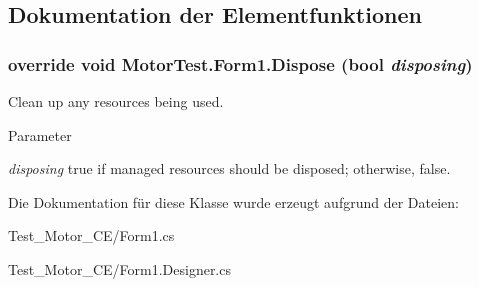 \subsection{Dokumentation der Elementfunktionen}
\hypertarget{class_motor_test_1_1_form1_ac013ea3d053663a5aa419e04c31e5273}{
\subsubsection[{Dispose}]{\setlength{\rightskip}{0pt plus 5cm}override void MotorTest.Form1.Dispose (bool {\em disposing})}}
\label{class_motor_test_1_1_form1_ac013ea3d053663a5aa419e04c31e5273}


Clean up any resources being used. 


\begin{DoxyParams}{Parameter}
\item[{\em disposing}]true if managed resources should be disposed; otherwise, false.\end{DoxyParams}


Die Dokumentation für diese Klasse wurde erzeugt aufgrund der Dateien:\begin{DoxyCompactItemize}
\item 
Test\_\-Motor\_\-CE/Form1.cs\item 
Test\_\-Motor\_\-CE/Form1.Designer.cs\end{DoxyCompactItemize}
